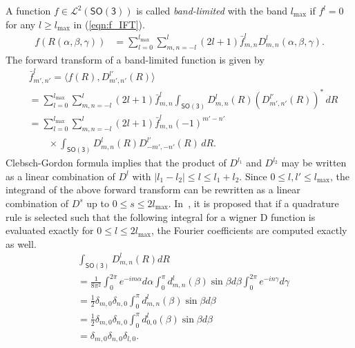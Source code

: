 \documentclass{ieeetran}
\newcommand{\pair}[1]{\ensuremath{\langle #1 \rangle}}
\newcommand{\refeqn}[1]{(\ref{eqn:#1})}
\newcommand{\SO}{\ensuremath{\mathsf{SO(3)}}}
\begin{document}
A function $f\in\mathcal{L}^2(\SO)$ is called \textit{band-limited} with the band $l_{\max}$ if $f^l=0$ for any $l\geq l_{\max}$ in \refeqn{f_IFT}.
\begin{align*}
f(R(\alpha,\beta,\gamma)) &= \sum_{l=0}^{l_{\max}} \sum_{m,n=-l}^l (2l+1)\bar f^l_{m,n} D^l_{m,n}(\alpha,\beta,\gamma).
\end{align*}
The forward transform of a band-limited function is given by
\begin{align*}
&\bar f^l_{m',n'}=\pair{ f(R), D^{l'}_{m',n'}(R)}\\
&=\sum_{l=0}^{l_{\max}} \sum_{m,n=-l}^l (2l+1)\bar f^l_{m,n} \int_{\SO}D^l_{m,n}(R)(D^{l'}_{m',n'}(R))^*\, dR\\
&=\sum_{l=0}^{l_{\max}} \sum_{m,n=-l}^l (2l+1)\bar f^l_{m,n} (-1)^{m'-n'}\nonumber\\
&\quad\quad\times\int_{\SO}D^l_{m,n}(R)D^{l'}_{-m',-n'}(R)\, dR.
\end{align*}
Clebsch-Gordon formula implies that the product of $D^{l_1}$ and $D^{l_2}$ may be written as a linear combination of $D^l$ with $|l_1-l_2|\leq l\leq l_1+l_2$. Since $0\leq l,l'\leq l_{\max}$, the integrand of the above forward transform can be rewritten as a linear combination of $D^s$ up to $0 \leq s\leq 2{l_{\max}}$. In~\cite{MasRocGC97}, it is proposed that if a quadrature rule is selected such that the following integral for a wigner D function is evaluated exactly for $0\leq l \leq 2l_{\max}$, the Fourier coefficients are computed exactly as well. 
\begin{align}
&\int_{\SO} D^l_{m,n} (R) dR\nonumber\\
& = \frac{1}{8\pi^2} \int_0^{2\pi} e^{-im\alpha} d\alpha
\int_0^{\pi} d^l_{m,n}(\beta)\sin\beta d\beta \int_0^{2\pi} e^{-in\gamma} d\gamma\nonumber\\
& = \frac{1}{2}\delta_{m,0}\delta_{n,0} \int_0^{\pi} d^l_{m,n}(\beta)\sin\beta d\beta\nonumber\\
& = \frac{1}{2}\delta_{m,0}\delta_{n,0} \int_0^{\pi} d^l_{0,0}(\beta)\sin\beta d\beta\nonumber\\
& = \delta_{m,0}\delta_{n,0}\delta_{l,0}.\label{eqn:intD}
\end{align}
\end{document}
